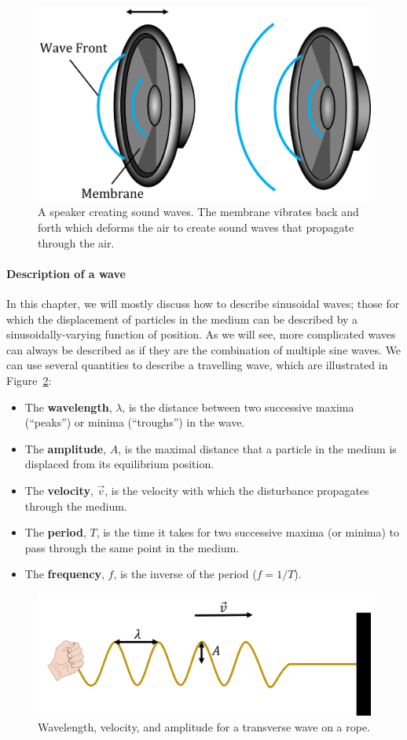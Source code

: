 \begin{figure}[!htbp]
\centering
\includegraphics[width=0.6\linewidth]{files/speaker-3abc5643ad51e7f35ed507b362ea47e3.png}
\caption[]{A speaker creating sound waves. The membrane vibrates back and forth which deforms the air to create sound waves that propagate through the air.}
\label{fig:waves:speaker}
\end{figure}

\paragraph{Description of a wave}

In this chapter, we will mostly discuss how to describe sinusoidal waves; those for which the displacement of particles in the medium can be described by a sinusoidally-varying function of position. As we will see, more complicated waves can always be described as if they are the combination of multiple sine waves. We can use several quantities to describe a travelling wave, which are illustrated in Figure~\ref{fig:waves:wavelength}:

\begin{itemize}
\item The \textbf{wavelength}, $\lambda$, is the distance between two  successive maxima (``peaks'') or minima (``troughs'') in the wave.
\item The \textbf{amplitude}, $A$, is the maximal distance that a particle in the medium is displaced from its equilibrium position.
\item The \textbf{velocity}, $\vec v$, is the velocity with which the disturbance propagates through the medium.
\item The \textbf{period}, $T$, is the time it takes for two successive maxima (or minima) to pass through the same point in the medium.
\item The \textbf{frequency}, $f$, is the inverse of the period ($f=1/T$).
\end{itemize}

\begin{figure}[!htbp]
\centering
\includegraphics[width=0.6\linewidth]{files/wavelength-712d212633d75161a04c533bf9ec7922.png}
\caption[]{Wavelength, velocity, and amplitude for a transverse wave on a rope.}
\label{fig:waves:wavelength}
\end{figure}

